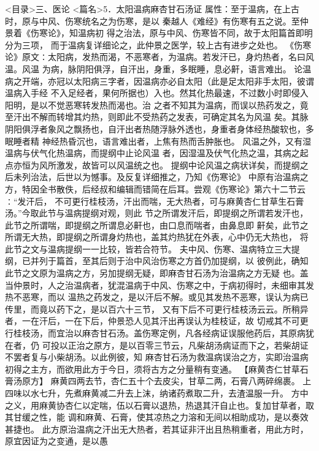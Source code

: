 \documentclass[a4paper,12pt,UTF8,twoside]{ctexbook}
\begin{document}
<目录>三、医论
<篇名>5．太阳温病麻杏甘石汤证
属性：至于温病，在上古时，原与中风、伤寒统名之为伤寒，是以 
秦越人《难经》有伤寒有五之说。至仲景着《伤寒论》，知温病初 
得之治法，原与中风、伤寒皆不同，故于太阳篇首即明分为三项， 
而于温病复详细论之，此仲景之医学，较上古有进步之处也。 
《伤寒论》原文∶太阳病，发热而渴，不恶寒者，为温病。若发汗已，身灼热者，名曰风温。风温 
为病，脉阴阳俱浮，自汗出，身重，多眠睡，息必鼾，语言难出。 
论温病之开端，亦冠以太阳病三字者，因温病亦必自太阳（此是足太阳非手太阳，彼谓温病入手经 
不入足经者，果何所据也）入也。然其化热最速，不过数小时即侵入阳明，是以不觉恶寒转发热而渴也。治 
之者不知其为温病，而误以热药发之，竟至汗出不解而转增其灼热，则即此不受热药之发表，可确定其名为风温 
矣。其脉阴阳俱浮者象风之飘扬也，自汗出者热随浮脉外透也，身重者身体经热酸软也，多眠睡者精 
神经热昏沉也，语言难出者，上焦有热而舌肿胀也。 
风温之外，又有湿温病与伏气化热温病，而提纲中止论风温 
者，因湿温及伏气化热之温，其病之起点亦恒为风所激发，故皆可以风温统之也。 
提纲中论风温之病状详矣，而提纲之后未列治法，后世以为憾事。及反复详细推之，乃知《伤寒论》 
中原有治温病之方，特因全书散佚，后经叔和编辑而错简在后耳。尝观《伤寒论》第六十二节云∶“发汗后， 
不可更行桂枝汤，汗出而喘，无大热者，可与麻黄杏仁甘草生石膏汤。”今取此节与温病提纲对观，则此 
节之所谓发汗后，即提纲之所谓若发汗也，此节之所谓喘，即提纲之所谓息必鼾也，由口息而喘者，由鼻息即 
鼾矣，此节之所谓无大热，即提纲之所谓身灼热也，盖其灼热犹在外表，心中仍无大热也， 
将此节之文与温病提纲一一比较，皆若合符节。 
夫中风、伤寒、温病特立三大提纲，已并列于篇首，至其后则于治中风治伤寒之方首仍加提纲，以 
彼例此，确知此节之文原为温病之方，另加提纲无疑，即麻杏甘石汤为治温病之方无疑 
也。盖当仲景时，人之治温病者，犹混温病于中风、伤寒之中，于病初得时，未细审其发热不恶寒，而以 
温热之药发之，是以汗后不解。或见其发热不恶寒，误认为病已传里，而竟以药下之，是以百六十三节， 
又有下后不可更行桂枝汤云云。所稍异者，一在汗后，一在下后，仲景恐人见其汗出再误认为桂枝证，故 
切戒其不可更行桂枝汤，而宜治以麻杏甘石汤。盖伤寒定例，凡各经病证误服他药后，其原病犹在者，仍 
可投以正治之原方，是以百零三节云，凡柴胡汤病证而下之，若柴胡证不罢者复与小柴胡汤。以此例彼，知 
麻杏甘石汤为救温病误治之方，实即治温病初得之主方，而欲用此方于今日，须将古方之分量稍有变通。 
【麻黄杏仁甘草石膏汤原方】 麻黄四两去节，杏仁五十个去皮尖，甘草二两，石膏八两碎绵裹。 
上四味以水七升，先煮麻黄减二升去上沫，纳诸药煮取二升，去渣温服一升。 
方中之义，用麻黄协杏仁以定喘，伍以石膏以退热，热退其汗自止也。复加甘草者，取其甘缓之性，能 
调和麻黄、石膏，使其凉热之力溶和无间以相助成功，是以奏效甚捷也。 
此方原治温病之汗出无大热者，若其证非汗出且热稍重者，用此方时，原宜因证为之变通，是以愚 
\end{document}
